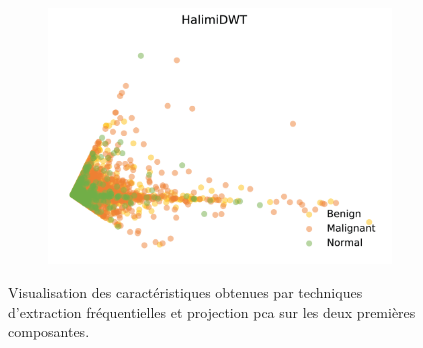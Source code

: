 \begin{figure}[H]
\begin{subfigure}{.3\textwidth}
      \includegraphics[width=\textwidth]{contents/chapter_4/resources/visualisation_frequency_halimidwt.png}
    \end{subfigure}
    
    \caption{Visualisation des caractéristiques obtenues par techniques d'extraction fréquentielles et projection \gls{pca} sur les deux premières composantes.}
    \label{fig:visualisation_frequency}
\end{figure}\par

